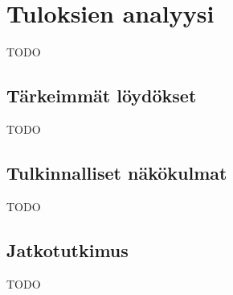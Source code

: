 \vspace{21.5pt}
\chapter{Tuloksien analyysi}
TODO

\section{Tärkeimmät löydökset}

TODO

\section{Tulkinnalliset näkökulmat}

TODO

\section{Jatkotutkimus}

TODO